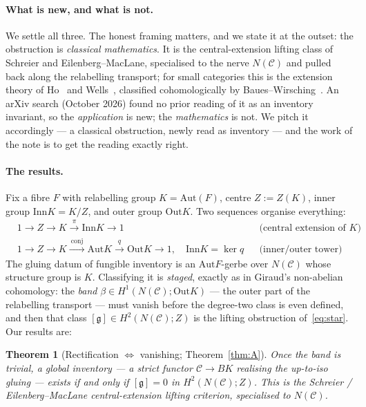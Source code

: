 \documentclass[11pt]{article}
\newtheorem{theorem}{Theorem}
\theoremstyle{definition}
\newcommand{\C}{\mathcal{C}}
\newcommand{\Aut}{\mathrm{Aut}}
\newcommand{\Inn}{\mathrm{Inn}}
\newcommand{\Out}{\mathrm{Out}}
\newcommand{\Zc}{Z}
\newcommand{\gerbe}{\mathfrak{g}}
\begin{document}
\paragraph{What is new, and what is not.}
We settle all three. The honest framing matters, and we state it at the outset: the obstruction
is \emph{classical mathematics}. It is the central-extension lifting class of Schreier and
Eilenberg--MacLane, specialised to the nerve $N(\C)$ and pulled back along the relabelling
transport; for small categories this is the extension theory of Ho~\cite{ho} and
Wells~\cite{wells}, classified cohomologically by Baues--Wirsching~\cite{bw}. An arXiv search
(October 2026) found no prior reading of it as an inventory invariant, so the \emph{application}
is new; the \emph{mathematics} is not. We pitch it accordingly --- a classical obstruction,
newly read as inventory --- and the work of the note is to get the reading exactly right.

\paragraph{The results.}
Fix a fibre $F$ with relabelling group $K=\Aut(F)$, centre $\Zc:=Z(K)$, inner group
$\Inn K=K/\Zc$, and outer group $\Out K$. Two sequences organise everything:
\begin{align}
&1 \longrightarrow \Zc \longrightarrow K \xrightarrow{\ \pi\ } \Inn K \longrightarrow 1
&&\text{(central extension of $K$)}\label{eq:star}\tag{$\star$}\\
&1\to\Zc\to K\xrightarrow{\ \mathrm{conj}\ }\Aut K\xrightarrow{\ q\ }\Out K\to1,\quad
\Inn K=\ker q
&&\text{(inner/outer tower)}\label{eq:tower}\tag{$\star\star$}
\end{align}
The gluing datum of fungible inventory is an $\Aut F$-gerbe over $N(\C)$ whose structure group is
$K$. Classifying it is \emph{staged}, exactly as in Giraud's non-abelian cohomology: the
\emph{band} $\beta\in H^1(N(\C);\Out K)$ --- the outer part of the relabelling transport --- must
vanish before the degree-two class is even defined, and then that class
$[\gerbe]\in H^2(N(\C);\Zc)$ is the lifting obstruction of~\eqref{eq:star}. Our results are:

\begin{theorem}[Rectification $\Leftrightarrow$ vanishing; Theorem~\ref{thm:A}]
Once the band is trivial, a global inventory --- a strict functor $\C\to BK$ realising the
up-to-iso gluing --- exists if and only if $[\gerbe]=0$ in $H^2(N(\C);\Zc)$. This is the Schreier /
Eilenberg--MacLane central-extension lifting criterion, specialised to $N(\C)$.
\end{theorem}
\end{document}

